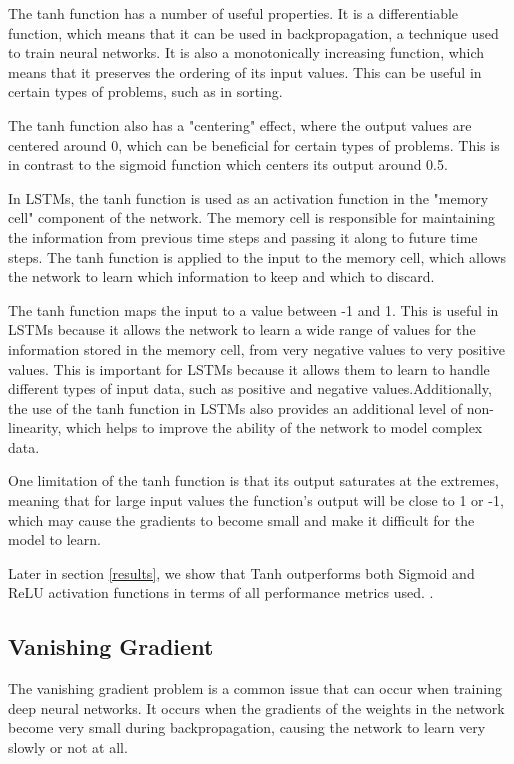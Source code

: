 \documentclass[a4paper]{article}
\begin{document}
The tanh function has a number of useful properties. It is a differentiable function, which means that it can be used in backpropagation, a technique used to train neural networks. It is also a monotonically increasing function, which means that it preserves the ordering of its input values. This can be useful in certain types of problems, such as in sorting.

The tanh function also has a "centering" effect, where the output values are centered around 0, which can be beneficial for certain types of problems. This is in contrast to the sigmoid function which centers its output around 0.5.


In LSTMs, the tanh function is used as an activation function in the "memory cell" component of the network. The memory cell is responsible for maintaining the information from previous time steps and passing it along to future time steps. The tanh function is applied to the input to the memory cell, which allows the network to learn which information to keep and which to discard.

The tanh function maps the input to a value between -1 and 1. This is useful in LSTMs because it allows the network to learn a wide range of values for the information stored in the memory cell, from very negative values to very positive values. This is important for LSTMs because it allows them to learn to handle different types of input data, such as positive and negative values.Additionally, the use of the tanh function in LSTMs also provides an additional level of non-linearity, which helps to improve the ability of the network to model complex data.

One limitation of the tanh function is that its output saturates at the extremes, meaning that for large input values the function's output will be close to 1 or -1, which may cause the gradients to become small and make it difficult for the model to learn.

Later in section \ref{results}, we show that Tanh outperforms both Sigmoid and ReLU activation functions in terms of all performance metrics used.
.
\subsection{Vanishing Gradient} \label{gradient}
The vanishing gradient problem is a common issue that can occur when training deep neural networks. It occurs when the gradients of the weights in the network become very small during backpropagation, causing the network to learn very slowly or not at all.
\end{document}
